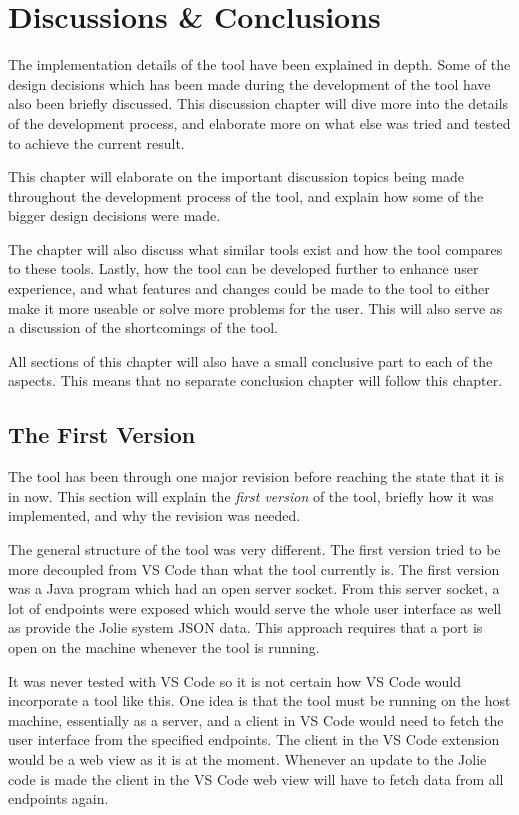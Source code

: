 \chapter{Discussions \& Conclusions}
The implementation details of the tool have been explained in depth. Some of the design decisions which has been made during the development of the tool have also been briefly discussed.
This discussion chapter will dive more into the details of the development process, and elaborate more on what else was tried and tested to achieve the current result.

This chapter will elaborate on the important discussion topics being made throughout the development process of the tool, and explain how
some of the bigger design decisions were made.

The chapter will also discuss what similar tools exist and how the tool compares to these tools. Lastly, how the tool can be developed further to enhance user experience, and what features and changes could be made to the tool to either make it more useable
or solve more problems for the user. This will also serve as a discussion of the shortcomings of the tool.

All sections of this chapter will also have a small conclusive part to each of the aspects. This means that no separate conclusion chapter will follow this chapter.

\section{The First Version}
The tool has been through one major revision before reaching the state that it is in now. This section
will explain the \textit{first version} of the tool, briefly how it was implemented, and why the revision was needed.

The general structure of the tool was very different. The first version tried to be more decoupled from VS Code than what the tool currently is.
The first version was a Java program which had an open server socket. From this server socket, a lot of endpoints were exposed which would serve the whole user interface as well as provide the Jolie system JSON data.
This approach requires that a port is open on the machine whenever the tool is running.

It was never tested with VS Code so it is not certain how VS Code would incorporate a tool like this. One idea is
that the tool must be running on the host machine, essentially as a server, and a client in VS Code would need to fetch the user interface from the specified endpoints.
The client in the VS Code extension would be a web view as it is at the moment.
Whenever an update to the Jolie code is made the client in the VS Code web view will have to fetch data from all endpoints again.

